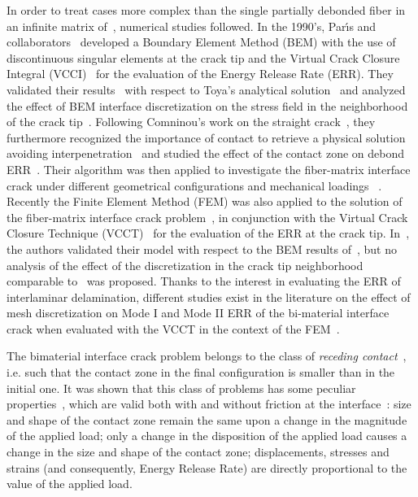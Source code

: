 In order to treat cases more complex than the single partially debonded fiber in an infinite matrix of~\cite{England1966,Perlman1967,Toya1974}, numerical studies followed. In the 1990's, Par{\'{\i}}s and collaborators~\cite{Paris1996} developed a Boundary Element Method (BEM) with the use of discontinuous singular elements at the crack tip and the Virtual Crack Closure Integral (VCCI)~\cite{Irwin1958} for the evaluation of the Energy Release Rate (ERR). They validated their results~\cite{Paris1996} with respect to Toya's analytical solution~\cite{Toya1974} and analyzed the effect of BEM interface discretization on the stress field in the neighborhood of the crack tip~\cite{DelCano1997}. Following Comninou's work on the straight crack~\cite{Comninou1977}, they furthermore recognized the importance of contact to retrieve a physical solution avoiding interpenetration~\cite{Paris1996} and studied the effect of the contact zone on debond ERR~\cite{Varna1997a}. Their algorithm was then applied to investigate the fiber-matrix interface crack under different geometrical configurations and mechanical loadings ~\cite{Paris2007,Correa2007,Correa2011,Correa2013,Correa2014,Sandino2016,Sandino2018}.\\
Recently the Finite Element Method (FEM) was also applied to the solution of the fiber-matrix interface crack problem~\cite{Zhuang2018,Varna2017,Zhuang2018a}, in conjunction with the Virtual Crack Closure Technique (VCCT)~\cite{Rybicki1977,Krueger2004} for the evaluation of the ERR at the crack tip. In~\cite{Zhuang2018}, the authors validated their model with respect to the BEM results of~\cite{Paris1996}, but no analysis of the effect of the discretization in the crack tip neighborhood comparable to~\cite{DelCano1997} was proposed. Thanks to the interest in evaluating the ERR of interlaminar delamination, different studies exist in the literature on the effect of mesh discretization on Mode I and Mode II ERR of the bi-material interface crack when evaluated with the VCCT in the context of the FEM~\cite{Sun1987,Manoharan1990,Sun1997}.

The bimaterial interface crack problem belongs to the class of \emph{receding contact}~\cite{Paris1996,Garrido1991}, i.e. such that the contact zone in the final configuration is smaller than in the initial one. It was shown that this class of problems has some peculiar properties~\cite{Keer1972,Tsai1974}, which are valid both with and without friction at the interface~\cite{Paris1996,Garrido1991}: size and shape of the contact zone remain the same upon a change in the magnitude of the applied load; only a change in the disposition of the applied load causes a change in the size and shape of the contact zone; displacements, stresses and strains (and consequently, Energy Release Rate) are directly proportional to the value of the applied load.

